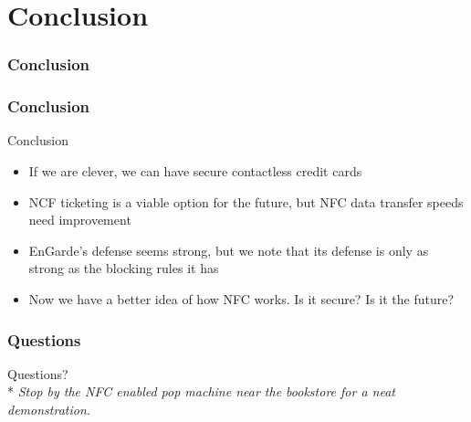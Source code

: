 \documentclass[unknownkeysallowed]{beamer}
\begin{document}
\section{Conclusion}
\begin{frame}
\frametitle{Conclusion}
\begin{center}\begin{minipage}{.9\textwidth}
\tableofcontents[currentsubsection, hideothersubsections, sectionstyle=show/shaded]
\end{minipage}\end{center}
\end{frame}
%

\begin{frame}
\frametitle{Conclusion}
  \begin{center}
  \begin{minipage}{.9\textwidth}
  \begin{block}{Conclusion}
    \begin{itemize}
      \item{If we are clever, we can have secure contactless credit cards}
      \pause
      \vspace{1mm}
      \item{NCF ticketing is a viable option for the future, but NFC data transfer speeds need improvement}
      \pause
      \vspace{1mm}
      \item{EnGarde's defense seems strong, but we note that its defense is only as strong as the blocking rules it has}
      \pause
      \vspace{1mm}
      \item{Now we have a better idea of how NFC works. Is it secure? Is it the future?}
    \end{itemize}
  \end{block}
  \end{minipage}
  \end{center}
\end{frame}

\begin{frame}
  \frametitle{Questions}
  \begin{center}
    {\huge \textcolor{uipoppy}{Questions?}}\\*
        \vspace{.7cm}
        \textcolor{uipaleblue}{\textit{Stop by the NFC enabled pop machine near the bookstore for a neat demonstration.}}
\end{center}
\end{frame}
\end{document}
